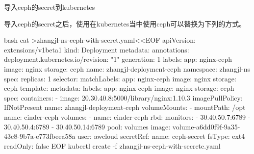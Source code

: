\begin{outline}[enumerate]
\1 导入ceph的secret到kubernetes
导入ceph的secret之后，使用在kubernetes当中使用ceph可以替换为下列的方式。
\begin{code-in-enumerate}{bash}
cat >zhangjl-ns-ceph-with-secret.yaml<<EOF
apiVersion: extensions/v1beta1
kind: Deployment
metadata:
  annotations:
    deployment.kubernetes.io/revision: "1"
  generation: 1
  labels:
    app: nginx-ceph
    image: nginx
    storage: ceph
  name: zhangjl-deployment-ceph
  namespace: zhangjl-ns
spec:
  replicas: 1
  selector:
    matchLabels:
      app: nginx-ceph
      image: nginx
      storage: ceph
  template:
    metadata:
      labels:
        app: nginx-ceph
        image: nginx
        storage: ceph
    spec:
      containers:
      - image: 20.30.40.8:5000/library/nginx:1.10.3
        imagePullPolicy: IfNotPresent
        name: zhangjl-deployment-ceph
        volumeMounts:
        - mountPath: /opt
          name: cinder-ceph
      volumes:
      - name: cinder-ceph
        rbd:
          monitors:
          - 30.40.50.7:6789
          - 30.40.50.4:6789
          - 30.40.50.14:6789
          pool: volumes
          image: volume-a6dd0f9f-9a35-43c8-9b7a-e773fbeea58a
          user: awcloud
          secretRef:
            name: ceph-secret
          fsType: ext4
          readOnly: false
EOF
kubectl create -f zhangjl-ns-ceph-with-secrete.yaml
\end{code-in-enumerate}

\end{outline}
